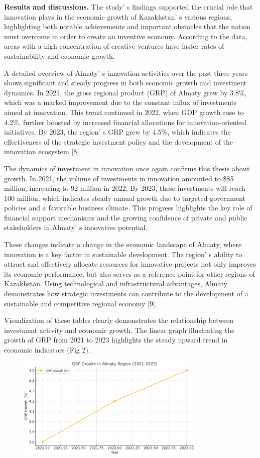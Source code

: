 {\bfseries Results and discussions.} The study' s findings
supported the crucial role that innovation plays in the economic growth
of Kazakhstan' s various regions, highlighting both
notable achievements and important obstacles that the nation must
overcome in order to create an inventive economy. According to the data,
areas with a high concentration of creative ventures have faster rates
of sustainability and economic growth.

A detailed overview of Almaty' s innovation activities
over the past three years shows significant and steady progress in both
economic growth and investment dynamics. In 2021, the gross regional
product (GRP) of Almaty grew by 3.8\%, which was a marked improvement
due to the constant influx of investments aimed at innovation. This
trend continued in 2022, when GDP growth rose to 4.2\%, further boosted
by increased financial allocations for innovation-oriented initiatives.
By 2023, the region' s GRP grew by 4.5\%, which indicates
the effectiveness of the strategic investment policy and the development
of the innovation ecosystem {[}8{]}.

The dynamics of investment in innovation once again confirms this thesis
about growth. In 2021, the volume of investments in innovation amounted
to \$85 million, increasing to 92 million in 2022. By 2023, these
investments will reach 100 million, which indicates steady annual growth
due to targeted government policies and a favorable business climate.
This progress highlights the key role of financial support mechanisms
and the growing confidence of private and public stakeholders in
Almaty' s innovative potential.

These changes indicate a change in the economic landscape of Almaty,
where innovation is a key factor in sustainable development. The
region' s ability to attract and effectively allocate
resources for innovative projects not only improves its economic
performance, but also serves as a reference point for other regions of
Kazakhstan. Using technological and infrastructural advantages, Almaty
demonstrates how strategic investments can contribute to the development
of a sustainable and competitive regional economy {[}9{]}.

Visualization of these tables clearly demonstrates the relationship
between investment activity and economic growth. The linear graph
illustrating the growth of GRP from 2021 to 2023 highlights the steady
upward trend in economic indicators (Fig 2).

\begin{figure}[H]
	\centering
	\includegraphics[width=0.8\textwidth]{media/ekon2/image4}
	\caption*{}
\end{figure}


